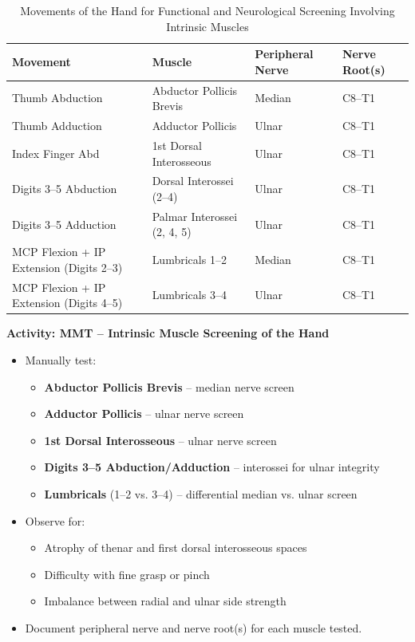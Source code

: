 \begin{table}[H]
\centering
\captionsetup{justification=raggedright, singlelinecheck=false}
\begin{tabular}{|p{4cm}|p{4.5cm}|p{4cm}|p{2.5cm}|}
\hline
\textbf{Movement} & \textbf{Muscle} & \textbf{Peripheral Nerve} & \textbf{Nerve Root(s)} \\
\hline
Thumb Abduction
  & Abductor Pollicis Brevis & Median & C8–T1 \\
\hline
Thumb Adduction
  & Adductor Pollicis & Ulnar & C8–T1 \\
\hline
Index Finger Abd
  & 1st Dorsal Interosseous & Ulnar & C8–T1 \\
\hline
Digits 3–5 Abduction
  & Dorsal Interossei (2–4) & Ulnar & C8–T1 \\
\hline
Digits 3–5 Adduction
  & Palmar Interossei (2, 4, 5) & Ulnar & C8–T1 \\
\hline
MCP Flexion + IP Extension (Digits 2–3)
  & Lumbricals 1–2 & Median & C8–T1 \\
\hline
MCP Flexion + IP Extension (Digits 4–5)
  & Lumbricals 3–4 & Ulnar & C8–T1 \\
\hline
\end{tabular}
\caption{Movements of the Hand for Functional and Neurological Screening Involving Intrinsic Muscles}
\end{table}

\vspace{0.5cm}

\begin{labactivitybox}
\textbf{Activity: MMT – Intrinsic Muscle Screening of the Hand}

\begin{itemize}
  \item Manually test:
  \begin{itemize}
    \item \textbf{Abductor Pollicis Brevis} – median nerve screen
    \item \textbf{Adductor Pollicis} – ulnar nerve screen
    \item \textbf{1st Dorsal Interosseous} – ulnar nerve screen
    \item \textbf{Digits 3–5 Abduction/Adduction} – interossei for ulnar integrity
    \item \textbf{Lumbricals} (1–2 vs. 3–4) – differential median vs. ulnar screen
  \end{itemize}
  \item Observe for:
  \begin{itemize}
    \item Atrophy of thenar and first dorsal interosseous spaces
    \item Difficulty with fine grasp or pinch
    \item Imbalance between radial and ulnar side strength
  \end{itemize}
  \item Document peripheral nerve and nerve root(s) for each muscle tested.
\end{itemize}
\end{labactivitybox}


